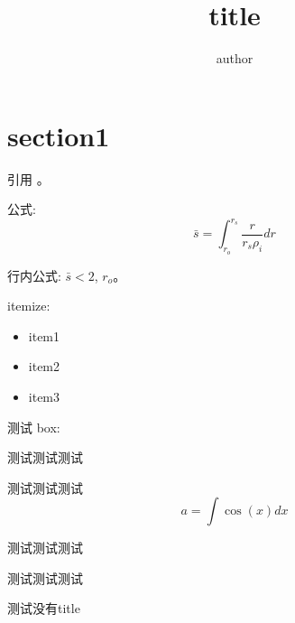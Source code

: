 \documentclass{article}
\title{title}
\author{author}
\begin{document}
\maketitle

\tableofcontents

\section{section1}
引用 \cite{tuszewski1988field}。

公式:
\begin{equation}
\bar{s} = \int_{r_o}^{r_s} \frac{r}{r_s \rho_i}   dr
\end{equation}

行内公式: $\bar{s}<2$, $r_o$。



itemize:
\begin{itemize}
\item item1
\item item2
\item item3
\end{itemize}

测试 box:
\begin{tcolorbox}
    [colback = Emerald!10, colframe = cyan!40!black, 
    title = title here]
    测试测试测试
\end{tcolorbox}


\begin{tcolorbox}[colback=OliveGreen!10,colframe=Green!70,
    title=title here]
    测试测试测试
    \begin{equation}
        a = \int \cos(x) dx
    \end{equation}
\end{tcolorbox}


\begin{tcolorbox}[colback=red!5,colframe=red!75!black,
    title = title here
    ]
    测试测试测试
\end{tcolorbox}

\begin{tcolorbox}
    [colback=Salmon!20, colframe=Salmon!90!Black,
    title = title here
    ]
    测试测试测试
\end{tcolorbox}

\begin{tcolorbox}
    [colback=Salmon!20, colframe=Salmon!90!Black
    ]
    测试没有title
\end{tcolorbox}
\end{document}
